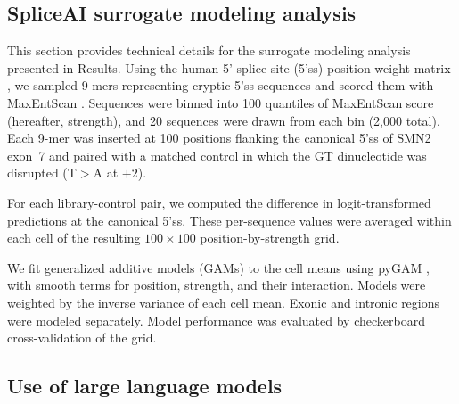\subsection*{SpliceAI surrogate modeling analysis}\label{subsec:spliceai-surrogate-analysis}

This section provides technical details for the surrogate modeling analysis presented in Results. Using the human 5' splice site (5'ss) position weight matrix \citep{Wong2018quantitative}, we sampled 9-mers representing cryptic 5'ss sequences and scored them with MaxEntScan \citep{Yeo2004me}. Sequences were binned into 100 quantiles of MaxEntScan score (hereafter, strength), and 20 sequences were drawn from each bin (2,000 total). Each 9-mer was inserted at 100 positions flanking the canonical 5'ss of SMN2 exon~7 and paired with a matched control in which the GT dinucleotide was disrupted (T$>$A at $+2$).

 For each library-control pair, we computed the difference in logit-transformed predictions at the canonical 5'ss. These per-sequence values were averaged within each cell of the resulting $100 \times 100$ position-by-strength grid.

We fit generalized additive models (GAMs) to the cell means using pyGAM \citep{Serven2018pg}, with smooth terms for position, strength, and their interaction. Models were weighted by the inverse variance of each cell mean. Exonic and intronic regions were modeled separately. Model performance was evaluated by checkerboard cross-validation of the grid.

\subsection*{Use of large language models}\label{subsec:llm-disclosure}


